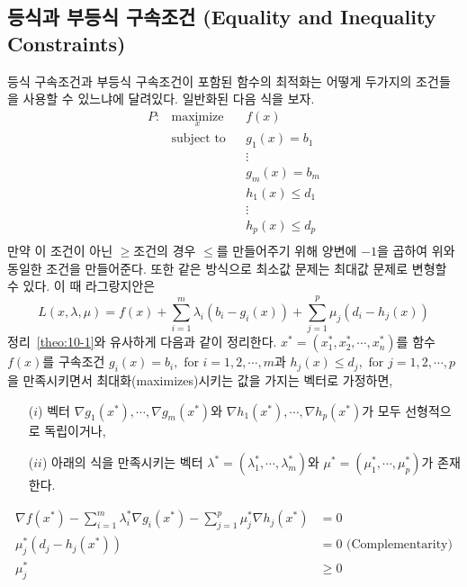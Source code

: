 \subsection{등식과 부등식 구속조건 (Equality and Inequality Constraints)}
등식 구속조건과 부등식 구속조건이 포함된 함수의 최적화는 어떻게 두가지의 조건들을 사용할 수 있느냐에 달려있다. 일반화된 다음 식을 보자.
\begin{equation*}
\begin{aligned}
P : & \underset{x}{\text{maximize}}
& & f(x)\\
& \text{subject to}
& & g_{1}(x)=b_{1}\\
& & & \vdots\\
& & & g_{m}(x)=b_{m}\\
& & & h_{1}(x)\leq d_{1}\\
& & & \vdots\\
& & & h_{p}(x)\leq d_{p}\\
\end{aligned}
\end{equation*}
만약 이 조건이 아닌 $\geq$조건의 경우 $\leq$를 만들어주기 위해 양변에 $-1$을 곱하여 위와 동일한 조건을 만들어준다. 또한 같은 방식으로 최소값 문제는 최대값 문제로 변형할 수 있다.
이 때 라그랑지안은
\begin{equation}
L(x,\lambda,\mu)=f(x)+\sum_{i=1}^{m}\lambda_{i}\left(b_{i}-g_{i}(x)\right)+\sum_{j=1}^{p}\mu_{j}\left(d_{i}-h_{j}(x)\right)
\end{equation}
정리~\ref{theo:10-1}와 유사하게 다음과 같이 정리한다.
$x^{*}=\left(x_{1}^{*},x_{2}^{*},\cdots,x_{n}^{*}\right)$를 함수 $f(x)$를 구속조건 $g_{i}(x)=b_{i},\text{ for }i=1,2,\cdots,m$과 $h_{j}(x)\leq d_{j},\text{ for }j=1,2,\cdots,p$을 만족시키면서 최대화(maximizes)시키는 값을 가지는 벡터로 가정하면,
\begin{itemize}
\item[($i$)] 벡터 $\nabla g_{1}(x^{*}),\cdots,\nabla g_{m}(x^{*})$와 $\nabla h_{1}(x^{*}),\cdots,\nabla h_{p}(x^{*})$가 모두 선형적으로 독립이거나,
\item[($ii$)] 아래의 식을 만족시키는 벡터 $\lambda^{*}=\left(\lambda_{1}^{*},\cdots,\lambda_{m}^{*}\right)$와 $\mu^{*}=\left(\mu_{1}^{*},\cdots,\mu_{p}^{*}\right)$가 존재한다.
\end{itemize}
\begin{align*}
\nabla f(x^{*})-\sum_{i=1}^{m}\lambda_{i}^{*}\nabla g_{i}(x^{*})-\sum_{j=1}^{p}\mu_{j}^{*}\nabla h_{j}(x^{*})&=0\\
\mu_{j}^{*}\left(d_{j}-h_{j}(x^{*})\right)&=0\text{ (Complementarity)}\\
\mu_{j}^{*}&\geq0
\end{align*}
